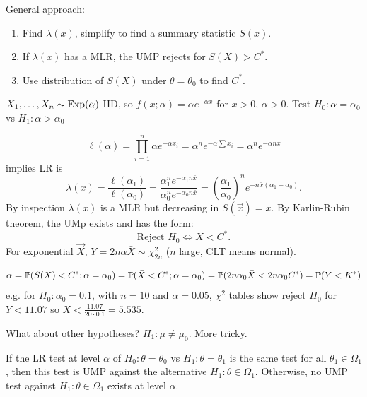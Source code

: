 \documentclass[10pt, a4paper]{article}
\begin{document}
General approach:
\begin{enumerate}[label = (\arabic*)]
    \item Find $\lambda(x)$,
    simplify to find a summary statistic $S(x)$.

    \item If $\lambda(x)$ has a MLR,
    the UMP rejects for $S(X) > C ^ {*}$.

    \item Use distribution of $S(X)$ under $\theta = \theta_0$ to find $C ^ {*}$.
\end{enumerate}

\begin{example}
    $X_1, \dotsc, X_n \sim \Exp(\alpha)$ IID,
    so $f(x; \alpha) = \alpha e ^ {-\alpha x}$ for $x > 0$,
    $\alpha > 0$.
    Test $H_0 : \alpha = \alpha_0$ vs $H_1 : \alpha > \alpha_0$

    \[
    \ell(\alpha) = \prod_{i = 1}^{n}\alpha e ^ {-\alpha x_i} = \alpha ^ n e ^ {-\alpha \sum x_i} = \alpha ^ ne ^ {-\alpha n\bar{x}}
    \]
    implies
    LR is
    \[
    \lambda(x) = \frac{\ell(\alpha_1)}{\ell(\alpha_0)} = \frac{\alpha_1 ^ ne ^ {-\alpha_1n\bar{x}}}{\alpha_0 ^ ne ^ {-\alpha_0 n\bar{x}}} = \left(\frac{\alpha_1}{\alpha_0}\right) ^ ne ^ {-n\bar{x}(\alpha_1 - \alpha_0)}.
    \]
    By inspection $\lambda(x)$ is a MLR but decreasing in $S(\vec{x}) = \bar{x}$.
    By Karlin-Rubin theorem,
    the UMp exists and has the form:
    \[
    \text{Reject $H_0$} \iff \bar{X} < C ^ {*}.
    \]
    For exponential $\vec{X}$,
    $Y = 2n\alpha\bar{X} \sim \chi_{2n}^{2}$
    ($n$ large,
    CLT means normal).

    \[
    \alpha = \P(S(X) < C ^ {*}; \alpha = \alpha_0) = \P(\bar{X} < C ^ {*}; \alpha = \alpha_0) = \P(2n\alpha_0\bar{X} < 2n\alpha_0 C^ {*}) = \P(Y < K ^ {*})
    \]
    e.g.
    for $H_0 : \alpha_0 = 0.1$,
    with $n = 10$ and $\alpha = 0.05$,
    $\chi ^ 2$ tables show reject $H_0$ for $Y < 11.07$ so $\bar{X} < \frac{11.07}{20 \cdot 0.1} = 5.535$.
\end{example}

What about other hypotheses?
$H_1 : \mu \neq \mu_0$.
More tricky.

\begin{proposition}
    If the LR test at level $\alpha$ of $H_0 : \theta = \theta_0$ vs $H_1 : \theta = \theta_1$ is the same test for all $\theta_1 \in \Omega_1$,
    then this test is UMP against the alternative $H_1 : \theta \in \Omega_1$.
    Otherwise,
    no UMP test against $H_1 : \theta \in \Omega_1$ exists at level $\alpha$.
\end{proposition}
\end{document}
